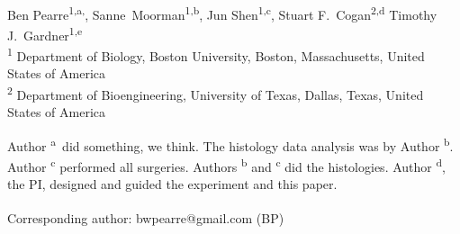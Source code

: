 \documentclass[10pt,letterpaper]{article}
\date{}
\begin{document}
\vspace*{0.35in}

\begin{flushleft}
{\Large
  \textbf{}
}
\newline
\\
Ben Pearre\textsuperscript{1,a,\textcurrency},
Sanne~Moorman\textsuperscript{1,b},
Jun Shen\textsuperscript{1,c},
Stuart F.~Cogan\textsuperscript{2,d}
Timothy J.~Gardner\textsuperscript{1,e}
\\
\bigskip
\textsuperscript{1} Department of Biology, Boston University, Boston, Massachusetts, United States of America\\
\textsuperscript{2} Department of Bioengineering, University of Texas, Dallas, Texas, United States of America
\\
\bigskip

% 
%
Author \textsuperscript{a}~did something, we think.  The histology data analysis was by Author \textsuperscript{b}. Author \textsuperscript{c} performed all surgeries.  Authors \textsuperscript{b} and \textsuperscript{c} did the histologies.  Author \textsuperscript{d}, the PI, designed and guided the experiment and this paper.





\textsuperscript{\textcurrency} Corresponding author: bwpearre@gmail.com (BP)

\end{flushleft}
\end{document}
